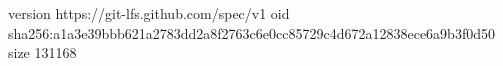version https://git-lfs.github.com/spec/v1
oid sha256:a1a3e39bbb621a2783dd2a8f2763c6e0cc85729c4d672a12838ece6a9b3f0d50
size 131168
